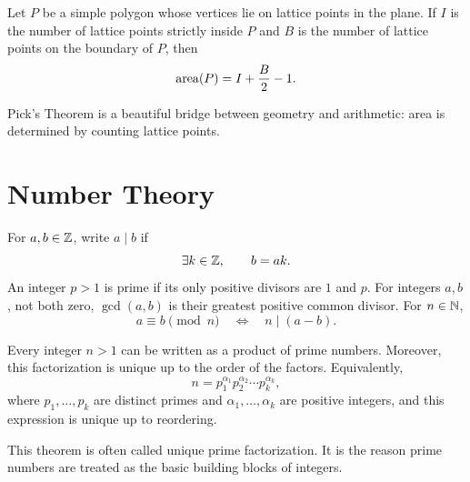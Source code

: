     \begin{theorem}
        Let $P$ be a simple polygon whose vertices lie on lattice points in the
        plane. If $I$ is the number of lattice points strictly inside $P$ and
        $B$ is the number of lattice points on the boundary of $P$, then
        \[
            \operatorname{area}(P)
            =
            I+\frac{B}{2}-1.
        \]
    \end{theorem}

    \begin{remark}
        Pick's Theorem is a beautiful bridge between geometry and arithmetic:
        area is determined by counting lattice points.
    \end{remark}

    \chapter{Number Theory}



    \begin{definition}
        For $a,b\in\mathbb{Z}$, write $a\mid b$ if
        \[
            \exists k\in\mathbb{Z},
            \qquad
            b=ak.
        \]
        An integer $p>1$ is prime if its only positive divisors are $1$ and
        $p$. For integers $a,b$, not both zero, $\gcd(a,b)$ is their greatest
        positive common divisor. For $n\in\mathbb{N}$,
        \[
            a\equiv b\pmod n
            \quad\Longleftrightarrow\quad
            n\mid(a-b).
        \]
    \end{definition}

    \begin{theorem}
        Every integer $n>1$ can be written as a product of prime numbers.
        Moreover, this factorization is unique up to the order of the factors.
        Equivalently,
        \[
            n=p_1^{\alpha_1}p_2^{\alpha_2}\cdots p_k^{\alpha_k},
        \]
        where $p_1,\dots,p_k$ are distinct primes and
        $\alpha_1,\dots,\alpha_k$ are positive integers, and this expression is
        unique up to reordering.
    \end{theorem}

    \begin{remark}
        This theorem is often called unique prime factorization. It is the
        reason prime numbers are treated as the basic building blocks of
        integers.
    \end{remark}

